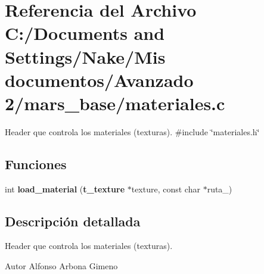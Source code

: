 \section{Referencia del Archivo C:/Documents and Settings/Nake/Mis documentos/Avanzado 2/mars\_\-base/materiales.c}
\label{materiales_8c}


Header que controla los materiales (texturas).  
{\ttfamily \#include \char`\"{}materiales.h\char`\"{}}\par
\subsection*{Funciones}
\begin{DoxyCompactItemize}
\item 
int {\bfseries load\_\-material} ({\bf t\_\-texture} $\ast$texture, const char $\ast$ruta\_\-)\label{materiales_8c_af92acd8f558230e1d94175ee20f6c432}

\end{DoxyCompactItemize}


\subsection{Descripción detallada}
Header que controla los materiales (texturas). \begin{DoxyAuthor}{Autor}
Alfonso Arbona Gimeno 
\end{DoxyAuthor}
